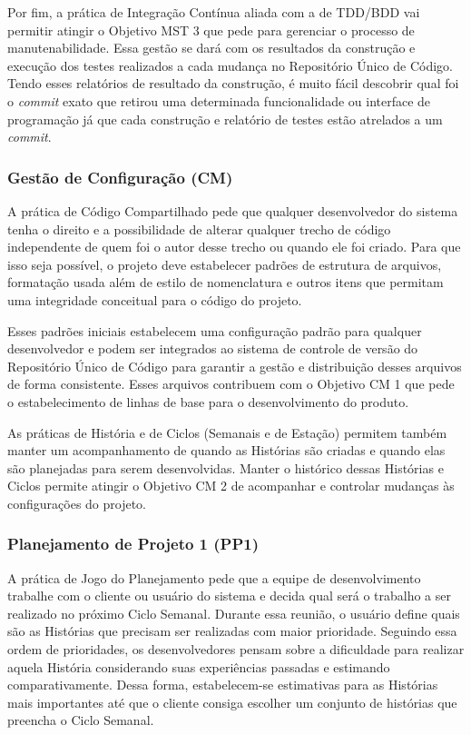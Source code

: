 Por fim, a prática de Integração Contínua aliada com a de TDD/BDD vai
permitir atingir o Objetivo MST 3 que pede para gerenciar o processo
de manutenabilidade. Essa gestão se dará com os resultados da
construção e execução dos testes realizados a cada mudança no
Repositório Único de Código. Tendo esses relatórios de resultado da
construção, é muito fácil descobrir qual foi o \textit{commit} exato
que retirou uma determinada funcionalidade ou interface de programação
já que cada construção e relatório de testes estão atrelados a um
\textit{commit}.

\subsubsection{Gestão de Configuração (CM)}
\label{sec:+cm}

A prática de Código Compartilhado pede que qualquer desenvolvedor do
sistema tenha o direito e a possibilidade de alterar qualquer trecho
de código independente de quem foi o autor desse trecho ou quando ele
foi criado. Para que isso seja possível, o projeto deve estabelecer
padrões de estrutura de arquivos, formatação usada além de estilo de
nomenclatura e outros itens que permitam uma integridade conceitual
para o código do projeto.

Esses padrões iniciais estabelecem uma configuração padrão para
qualquer desenvolvedor e podem ser integrados ao sistema de controle
de versão do Repositório Único de Código para garantir a gestão e
distribuição desses arquivos de forma consistente. Esses arquivos
contribuem com o Objetivo CM 1 que pede o estabelecimento de linhas de
base para o desenvolvimento do produto.

As práticas de História e de Ciclos (Semanais e de Estação) permitem
também manter um acompanhamento de quando as Histórias são criadas e
quando elas são planejadas para serem desenvolvidas. Manter o
histórico dessas Histórias e Ciclos permite atingir o Objetivo CM 2 de
acompanhar e controlar mudanças às configurações do projeto.

\subsubsection{Planejamento de Projeto 1 (PP1)}
\label{sec:+pp1}

A prática de Jogo do Planejamento pede que a equipe de desenvolvimento
trabalhe com o cliente ou usuário do sistema e decida qual será o
trabalho a ser realizado no próximo Ciclo Semanal. Durante essa
reunião, o usuário define quais são as Histórias que precisam ser
realizadas com maior prioridade. Seguindo essa ordem de prioridades,
os desenvolvedores pensam sobre a dificuldade para realizar aquela
História considerando suas experiências passadas e estimando
comparativamente. Dessa forma, estabelecem-se estimativas para as
Histórias mais importantes até que o cliente consiga escolher um
conjunto de histórias que preencha o Ciclo Semanal.

